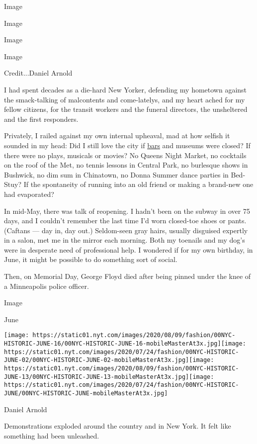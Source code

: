 Image

Image

Image

Image

Credit...Daniel Arnold

I had spent decades as a die-hard New Yorker, defending my hometown
against the smack-talking of malcontents and come-latelys, and my heart
ached for my fellow citizens, for the transit workers and the funeral
directors, the unsheltered and the first responders.

Privately, I railed against my own internal upheaval, mad at how selfish
it sounded in my head: Did I still love the city if
\href{https://www.nytimes.com/2020/05/21/nyregion/nyc-bars-coronavirus.html}{bars}
and museums were closed? If there were no plays, musicals or movies? No
Queens Night Market, no cocktails on the roof of the Met, no tennis
lessons in Central Park, no burlesque shows in Bushwick, no dim sum in
Chinatown, no Donna Summer dance parties in Bed-Stuy? If the spontaneity
of running into an old friend or making a brand-new one had evaporated?

In mid-May, there was talk of reopening. I hadn't been on the subway in
over 75 days, and I couldn't remember the last time I'd worn closed-toe
shoes or pants. (Caftans --- day in, day out.) Seldom-seen gray hairs,
usually disguised expertly in a salon, met me in the mirror each
morning. Both my toenails and my dog's were in desperate need of
professional help. I wondered if for my own birthday, in June, it might
be possible to do something sort of social.

Then, on Memorial Day, George Floyd died after being pinned under the
knee of a Minneapolis police officer.

Image

June

\texttt{[image: https://static01.nyt.com/images/2020/08/09/fashion/00NYC-HISTORIC-JUNE-16/00NYC-HISTORIC-JUNE-16-mobileMasterAt3x.jpg]}\texttt{[image: https://static01.nyt.com/images/2020/07/24/fashion/00NYC-HISTORIC-JUNE-02/00NYC-HISTORIC-JUNE-02-mobileMasterAt3x.jpg]}\texttt{[image: https://static01.nyt.com/images/2020/08/09/fashion/00NYC-HISTORIC-JUNE-13/00NYC-HISTORIC-JUNE-13-mobileMasterAt3x.jpg]}\texttt{[image: https://static01.nyt.com/images/2020/07/24/fashion/00NYC-HISTORIC-JUNE/00NYC-HISTORIC-JUNE-mobileMasterAt3x.jpg]}

Daniel Arnold

Demonstrations exploded around the country and in New York. It felt like
something had been unleashed.

